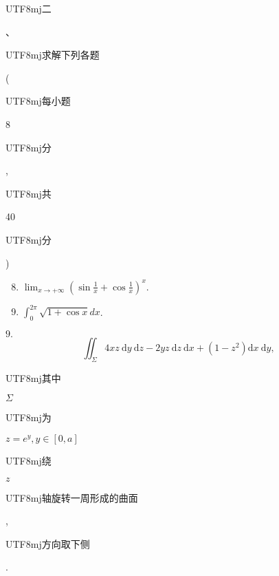 \documentclass[10pt]{article}
\begin{document}
\begin{CJK}{UTF8}{mj}二\end{CJK}、\begin{CJK}{UTF8}{mj}求解下列各题\end{CJK} (\begin{CJK}{UTF8}{mj}每小题\end{CJK} 8 \begin{CJK}{UTF8}{mj}分\end{CJK}, \begin{CJK}{UTF8}{mj}共\end{CJK} 40 \begin{CJK}{UTF8}{mj}分\end{CJK})

\begin{enumerate}
  \setcounter{enumi}{7}
  \item $\lim _{x \rightarrow+\infty}\left(\sin \frac{1}{x}+\cos \frac{1}{x}\right)^{x}$.

  \item $\int_{0}^{2 \pi} \sqrt{1+\cos x} d x$.

\end{enumerate}
$9 .$
$$
\iint_{\Sigma} 4 x z \mathrm{~d} y \mathrm{~d} z-2 y z \mathrm{~d} z \mathrm{~d} x+\left(1-z^{2}\right) \mathrm{d} x \mathrm{~d} y,
$$
\begin{CJK}{UTF8}{mj}其中\end{CJK} $\Sigma$ \begin{CJK}{UTF8}{mj}为\end{CJK} $z=e^{y}, y \in[0, a]$ \begin{CJK}{UTF8}{mj}绕\end{CJK} $z$ \begin{CJK}{UTF8}{mj}轴旋转一周形成的曲面\end{CJK}, \begin{CJK}{UTF8}{mj}方向取下侧\end{CJK}.
\end{document}
